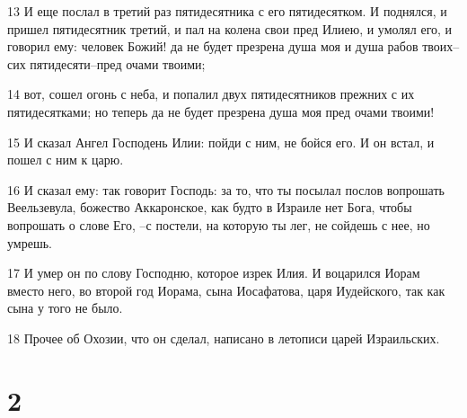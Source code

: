\par 13 И еще послал в третий раз пятидесятника с его пятидесятком. И поднялся, и пришел пятидесятник третий, и пал на колена свои пред Илиею, и умолял его, и говорил ему: человек Божий! да не будет презрена душа моя и душа рабов твоих--сих пятидесяти--пред очами твоими;
\par 14 вот, сошел огонь с неба, и попалил двух пятидесятников прежних с их пятидесятками; но теперь да не будет презрена душа моя пред очами твоими!
\par 15 И сказал Ангел Господень Илии: пойди с ним, не бойся его. И он встал, и пошел с ним к царю.
\par 16 И сказал ему: так говорит Господь: за то, что ты посылал послов вопрошать Веельзевула, божество Аккаронское, как будто в Израиле нет Бога, чтобы вопрошать о слове Его, --с постели, на которую ты лег, не сойдешь с нее, но умрешь.
\par 17 И умер он по слову Господню, которое изрек Илия. И воцарился Иорам вместо него, во второй год Иорама, сына Иосафатова, царя Иудейского, так как сына у того не было.
\par 18 Прочее об Охозии, что он сделал, написано в летописи царей Израильских.

\chapter{2}

